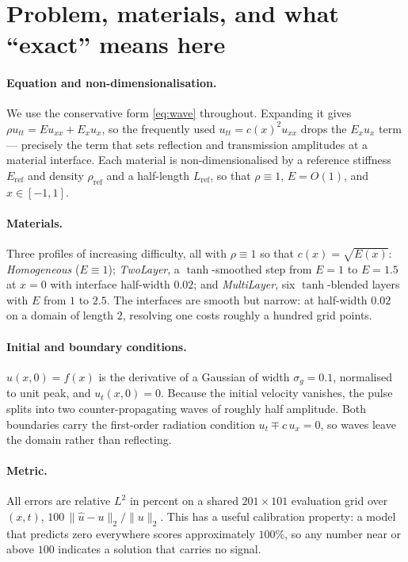 \section{Problem, materials, and what ``exact'' means here}
\label{sec:problem}

\paragraph{Equation and non-dimensionalisation.}
We use the conservative form \eqref{eq:wave} throughout. Expanding it gives
$\rho u_{tt} = E u_{xx} + E_x u_x$, so the frequently used
$u_{tt} = c(x)^2 u_{xx}$ drops the $E_x u_x$ term --- precisely the term that
sets reflection and transmission amplitudes at a material interface. Each
material is non-dimensionalised by a reference stiffness $E_{\mathrm{ref}}$ and
density $\rho_{\mathrm{ref}}$ and a half-length $L_{\mathrm{ref}}$, so that
$\rho \equiv 1$, $E = O(1)$, and $x \in [-1,1]$.

\paragraph{Materials.} Three profiles of increasing difficulty, all with
$\rho \equiv 1$ so that $c(x) = \sqrt{E(x)}$:
\emph{Homogeneous} ($E \equiv 1$);
\emph{TwoLayer}, a $\tanh$-smoothed step from $E = 1$ to $E = 1.5$ at $x=0$
with interface half-width $0.02$; and
\emph{MultiLayer}, six $\tanh$-blended layers with $E$ from $1$ to $2.5$.
The interfaces are smooth but narrow: at half-width $0.02$ on a domain of
length $2$, resolving one costs roughly a hundred grid points.

\paragraph{Initial and boundary conditions.}
$u(x,0) = f(x)$ is the derivative of a Gaussian of width $\sigma_g = 0.1$,
normalised to unit peak, and $u_t(x,0)=0$. Because the initial velocity
vanishes, the pulse splits into two counter-propagating waves of roughly half
amplitude. Both boundaries carry the first-order radiation condition
$u_t \mp c\,u_x = 0$, so waves leave the domain rather than reflecting.

\paragraph{Metric.} All errors are relative $L^2$ in percent on a shared
$201 \times 101$ evaluation grid over $(x,t)$,
$100\,\lVert \hat u - u \rVert_2 / \lVert u \rVert_2$. This has a useful
calibration property: a model that predicts zero everywhere scores
approximately $100\%$, so any number near or above $100$ indicates a solution
that carries no signal.

